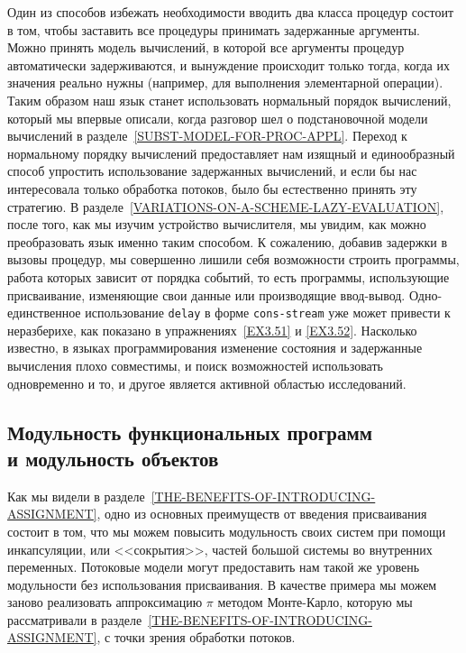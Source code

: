 Один из способов избежать необходимости вводить два
класса процедур состоит в том, чтобы заставить все процедуры принимать
задержанные аргументы.  Можно принять модель вычислений, в которой все
аргументы процедур автоматически задерживаются, и вынуждение
происходит только тогда, когда их значения реально нужны (например,
для выполнения элементарной операции). Таким образом наш язык станет
использовать нормальный порядок вычислений, который мы впервые
описали, когда разговор шел о подстановочной модели вычислений в
разделе~\ref{SUBST-MODEL-FOR-PROC-APPL}.  Переход к
нормальному порядку вычислений предоставляет нам изящный и
единообразный способ упростить использование задержанных вычислений, и
если бы нас интересовала только обработка потоков, было бы естественно
принять эту стратегию.  В
разделе~\ref{VARIATIONS-ON-A-SCHEME-LAZY-EVALUATION}, после того,
как мы изучим устройство вычислителя, мы увидим, как можно
преобразовать язык именно таким способом.  К сожалению, добавив
задержки в вызовы процедур, мы совершенно лишили себя возможности
строить программы, работа которых зависит от порядка событий, то есть
программы, использующие присваивание, изменяющие свои данные или
производящие ввод-вывод.  Одно-единственное использование
{\tt delay} в форме {\tt cons-stream} уже может привести к
неразберихе, как показано в упражнениях~\ref{EX3.51} и
\ref{EX3.52}.  Насколько известно, в языках
программирования изменение состояния и
задержанные вычисления плохо совместимы, и
поиск возможностей использовать одновременно и то, и другое является
активной областью исследований.

\subsection{Модульность функциональных программ\protect\\
  и модульность объектов}
\label{MODULARITY-OF-FUNCTIONAL-PROGRAMS-AND-MODULARITY-OF-OBJECTS}

Как мы видели в
разделе~\ref{THE-BENEFITS-OF-INTRODUCING-ASSIGNMENT}, одно из
основных преимуществ от введения присваивания состоит в том, что мы
можем повысить модульность своих систем при помощи инкапсуляции, или
<<сокрытия>>, частей большой системы во внутренних переменных.
Потоковые модели могут предоставить нам такой же уровень модульности
без использования присваивания.  В качестве примера мы можем заново
реализовать    аппроксимацию
$\pi$ методом Монте-Карло,
которую мы рассматривали в
разделе~\ref{THE-BENEFITS-OF-INTRODUCING-ASSIGNMENT}, с точки
зрения обработки потоков.

